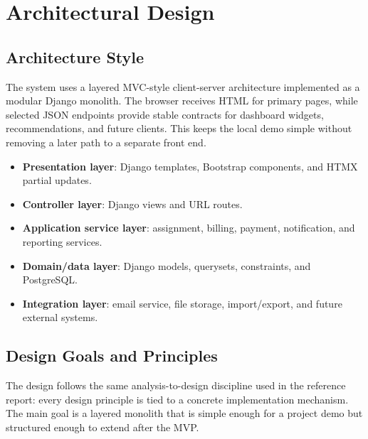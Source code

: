 \documentclass[11pt,a4paper]{article}
\begin{document}
\section{Architectural Design}

\subsection{Architecture Style}
The system uses a layered MVC-style client-server architecture implemented as a modular Django monolith. The browser receives HTML for primary pages, while selected JSON endpoints provide stable contracts for dashboard widgets, recommendations, and future clients. This keeps the local demo simple without removing a later path to a separate front end.

\begin{itemize}
  \item \textbf{Presentation layer}: Django templates, Bootstrap components, and HTMX partial updates.
  \item \textbf{Controller layer}: Django views and URL routes.
  \item \textbf{Application service layer}: assignment, billing, payment, notification, and reporting services.
  \item \textbf{Domain/data layer}: Django models, querysets, constraints, and PostgreSQL.
  \item \textbf{Integration layer}: email service, file storage, import/export, and future external systems.
\end{itemize}

\subsection{Design Goals and Principles}
The design follows the same analysis-to-design discipline used in the reference report: every design principle is tied to a concrete implementation mechanism. The main goal is a layered monolith that is simple enough for a project demo but structured enough to extend after the MVP.
\end{document}
